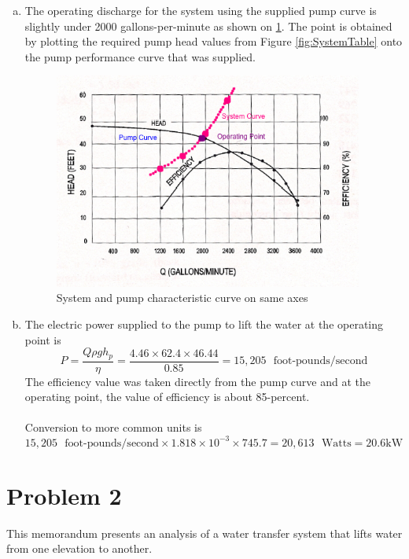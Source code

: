 \documentclass[12pt]{article}
\begin{document}
\begin{enumerate}[a)]
\item The operating discharge for the system using the supplied pump curve is slightly under 2000 gallons-per-minute as shown on \ref{fig:PumpCurve2}.
The point is obtained by plotting the required pump head values from Figure \ref{fig:SystemTable} onto the pump performance curve that was supplied.
\begin{figure}[h!] %
\centering
   \includegraphics[width=4in]{PumpCurve2.jpg}
   \caption{System and pump characteristic curve on same axes}
   \label{fig:PumpCurve2} 
\end{figure}
\item The electric power supplied to the pump to lift the water at the operating point is
\begin{equation}
P = \frac{Q \rho g h_p}{\eta} = \frac{4.46\times62.4\times46.44}{0.85} = 15,205 \text{~~foot-pounds/second}
\end{equation}
The efficiency value was taken directly from the pump curve and at the operating point, the value of efficiency is about 85-percent.
\\~\\ Conversion to more common units is 
\begin{equation}
15,205 \text{~~foot-pounds/second} \times 1.818\times10^{-3} \times 745.7 = 20,613 \text{~~Watts} = 20.6 \text{kW}
\end{equation}
\end{enumerate}

\section*{\small{Problem 2}}  
This memorandum presents an analysis of a water transfer system that lifts water from one elevation to another.
\end{document}
